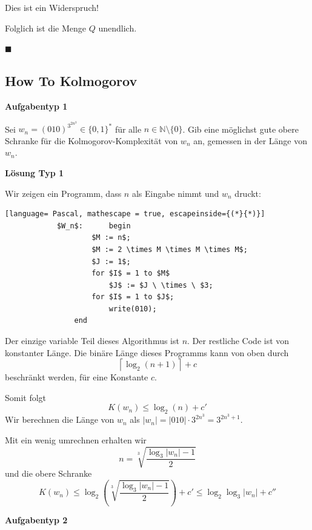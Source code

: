 \documentclass[a4paper, 11pt]{article}
\def\N{\mathbb{N}}
\begin{document}
        Dies ist ein Widerspruch! 
    
        Folglich ist die Menge $Q$ unendlich.
    
        \hspace*{0pt}\hfill$\blacksquare$
    
    
    
    \subsection{How To Kolmogorov}
    
    
    
        \textbf{Aufgabentyp 1}

        Sei $w_n = (010)^{3^{2n^3}} \in \{0,1\}^*$ für alle $n \in \N \setminus \{0\}$. Gib eine möglichst gute obere Schranke für die Kolmogorov-Komplexität von $w_n$ an, gemessen in der Länge von $w_n$.
        
        \textbf{Lösung Typ 1}
        
        Wir zeigen ein Programm, dass $n$ als Eingabe nimmt und $w_n$ druckt:
        \begin{lstlisting}[language= Pascal, mathescape = true, escapeinside={(*}{*)}]
            $W_n$:     	begin
                    $M := n$;
                    $M := 2 \times M \times M \times M$;
                    $J := 1$;
                    for $I$ = 1 to $M$                  
                        $J$ := $J \ \times \ $3;
                    for $I$ = 1 to $J$;
                        write(010);
                end
        \end{lstlisting}
    
        Der einzige variable Teil dieses Algorithmus ist $n$. Der restliche Code ist von konstanter Länge. Die binäre Länge dieses Programms kann von oben durch 
        $$\left\lceil\log_2(n+1)\right\rceil + c$$
        beschränkt werden, für eine Konstante $c$.
    
        Somit folgt
        $$K(w_n) \leq \log_2(n) + c'$$
        Wir berechnen die Länge von $w_n$ als $|w_n| = |010| \cdot 3^{2n^3} = 3^{2n^3+1}$. 
        
        Mit ein wenig umrechnen erhalten wir $$n = \sqrt[3]{\frac{\log_3|w_n| - 1}{2}}$$
        und die obere Schranke
        $$K(w_n) \leq \log_2 \left(\sqrt[3]{\frac{\log_3|w_n| - 1}{2}}\right)+ c' \leq \log_2 \log_3 |w_n| + c''$$
    
    \vspace*{1cm}
    
        \textbf{Aufgabentyp 2}
\end{document}
